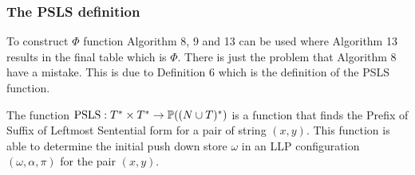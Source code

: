 \subsubsection{The PSLS definition}
To construct $\Phi$ function Algorithm 8, 9 and 13 \cite[13, 15]{Vagner2007} can be used where Algorithm 13 results in the final table which is $\Phi$. There is just the problem that Algorithm 8 have a mistake. This is due to Definition 6 \cite[12]{Vagner2007} which is the definition of the PSLS function.

The function $\text{PSLS}: T^* \times T^* \to \mathbb{P}((N \cup T)^*)$ is a function that finds the Prefix of Suffix of Leftmost Sentential form for a pair of string $(x, y)$. This function is able to determine the initial push down store $\omega$ in an LLP configuration $(\omega, \alpha, \pi)$ for the pair $(x, y)$.

